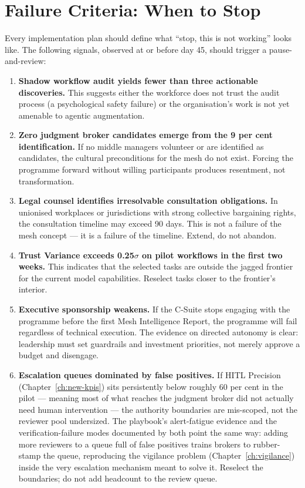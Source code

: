 \section{Failure Criteria: When to Stop}

Every implementation plan should define what ``stop, this is not working'' looks like. The following signals, observed at or before day 45, should trigger a pause-and-review:

\begin{enumerate}
  \item \textbf{Shadow workflow audit yields fewer than three actionable discoveries.} This suggests either the workforce does not trust the audit process (a psychological safety failure) or the organisation's work is not yet amenable to agentic augmentation.
  \item \textbf{Zero judgment broker candidates emerge from the 9 per cent identification.} If no middle managers volunteer or are identified as candidates, the cultural preconditions for the mesh do not exist. Forcing the programme forward without willing participants produces resentment, not transformation.
  \item \textbf{Legal counsel identifies irresolvable consultation obligations.} In unionised workplaces or jurisdictions with strong collective bargaining rights, the consultation timeline may exceed 90 days. This is not a failure of the mesh concept --- it is a failure of the timeline. Extend, do not abandon.
  \item \textbf{Trust Variance exceeds 0.25$\sigma$ on pilot workflows in the first two weeks.} This indicates that the selected tasks are outside the jagged frontier for the current model capabilities. Reselect tasks closer to the frontier's interior.
  \item \textbf{Executive sponsorship weakens.} If the C-Suite stops engaging with the programme before the first Mesh Intelligence Report, the programme will fail regardless of technical execution. The evidence on directed autonomy \parencite{MicrosoftDirectedAutonomy2025} is clear: leadership must set guardrails and investment priorities, not merely approve a budget and disengage.
  \item \textbf{Escalation queues dominated by false positives.} If HITL Precision (Chapter~\ref{ch:new-kpis}) sits persistently below roughly 60 per cent in the pilot --- meaning most of what reaches the judgment broker did not actually need human intervention --- the authority boundaries are mis-scoped, not the reviewer pool undersized. The playbook's alert-fatigue evidence and the verification-failure modes documented by \textcite{Cemri2025} both point the same way: adding more reviewers to a queue full of false positives trains brokers to rubber-stamp the queue, reproducing the vigilance problem (Chapter~\ref{ch:vigilance}) inside the very escalation mechanism meant to solve it. Reselect the boundaries; do not add headcount to the review queue.
\end{enumerate}

